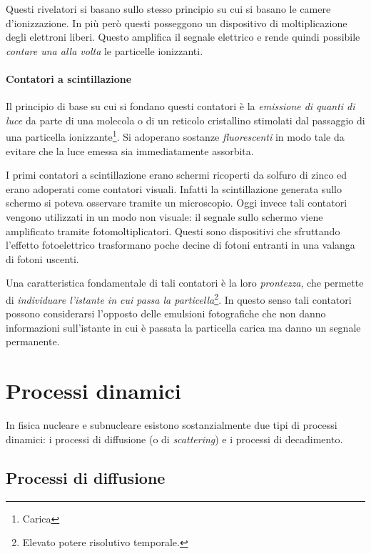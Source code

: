 Questi rivelatori si basano sullo stesso principio su cui si basano le camere 
d'ionizzazione. In più però questi posseggono un dispositivo di 
moltiplicazione degli elettroni liberi. Questo amplifica il segnale elettrico e 
rende quindi possibile \textit{contare una alla volta} le particelle ionizzanti.

\subsubsection{Contatori a scintillazione}

Il principio di base su cui si fondano questi contatori è la \textit{emissione 
di quanti di luce} da parte di una molecola o di un reticolo cristallino 
stimolati dal passaggio di una particella ionizzante\footnote{Carica }. Si 
adoperano sostanze \textit{fluorescenti} in modo tale da evitare che la luce 
emessa sia immediatamente assorbita.

I primi contatori a scintillazione erano schermi ricoperti da solfuro di zinco 
ed erano adoperati come contatori visuali. Infatti la scintillazione generata 
sullo schermo si poteva osservare tramite un microscopio. Oggi invece tali 
contatori vengono utilizzati in un modo non visuale: il segnale sullo schermo 
viene amplificato tramite fotomoltiplicatori. Questi sono dispositivi che 
sfruttando l'effetto fotoelettrico trasformano poche decine di fotoni entranti 
in una valanga di fotoni uscenti.

Una caratteristica fondamentale di tali contatori è la loro 
\textit{prontezza}, che permette di \textit{individuare l'istante in cui passa 
la particella}\footnote{Elevato potere risolutivo temporale. }. In questo senso 
tali contatori possono considerarsi l'opposto delle emulsioni fotografiche che 
non danno informazioni sull'istante in cui è passata la particella carica ma 
danno un segnale permanente.

\chapter{Processi dinamici}

In fisica nucleare e subnucleare esistono sostanzialmente
due tipi di processi dinamici: i processi di diffusione (o di
\textit{scattering}) e i processi di decadimento.

\section{Processi di diffusione}

